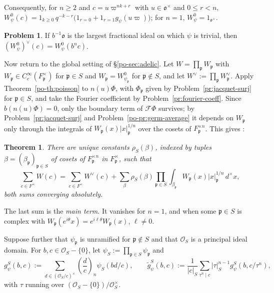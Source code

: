 \documentclass[reqno]{amsart}
\providecommand{\qr}[2]{\left(\frac{#1}{#2}\right)}
\newcommand{\Fc}{\mathcal{F}}
\newcommand{\oo}{\mathfrak{o}}
\newcommand{\pp}{\mathfrak{p}}
\numberwithin{equation}{section}
\theoremstyle{definition}
\newtheorem{problem}{Problem}[section]
\theoremstyle{plain}
\newtheorem{theorem}{Theorem}[section]
\begin{document}
Consequently, for $n \geq 2$ and $c = u \varpi^{n k + r}$ with $u \in \oo^\times$ and $0 \leq r < n$, $W_\psi^0(c) = 1_{k \geq 0} \, q^{-k-r} \bigl( 1_{r = 0} + 1_{r = 1} g_\psi(u \varpi) \bigr)$; for $n = 1$, $W_\psi^0 = 1_{\oo^\times}$.

\begin{problem}\label{pr:basic-dual}
  If $b^{-1} \oo$ is the largest fractional ideal on which $\psi$ is trivial, then $(W_\psi^0)^\vee(c) = W_\psi^0(b^n c)$.
\end{problem}

Now return to the global setting of \S\ref{po-sec:adelic}.  Let $W = \prod_\pp W_\pp$ with $W_\pp \in C_c^\infty(F_\pp^\times)$ for $\pp \in S$ and $W_\pp = W_{\psi_\pp}^0$ for $\pp \notin S$, and let $W^\vee := \prod_\pp W_\pp^\vee$.  Apply Theorem~\ref{po-th:poisson} to $n(u) \Phi$, with $\Phi_\pp$ given by Problem~\ref{pr:jacquet-surj} for $\pp \in S$, and take the Fourier coefficient by Problem~\ref{pr:fourier-coeff}.  Since $b(n(u) \Phi) = 0$, only the boundary term of $\Fc \Phi$ survives; by Problem~\ref{pr:jacquet-surj} and Problem~\ref{po-pr:germ-average} it depends on $W_\pp$ only through the integrals of $W_\pp(x) \lvert x \rvert_\pp^{1/n}$ over the cosets of $F_\pp^{\times n}$.  This gives \cite[Theorem~10.16]{N}:

\begin{theorem}\label{th:main}
  There are unique constants $\rho_S(\beta)$, indexed by tuples $\beta = (\beta_\pp)_{\pp \in S}$ of cosets of $F_\pp^{\times n}$ in $F_\pp^\times$, such that
  \begin{equation*}
    \sum_{c \in F^\times} W(c) = \sum_{c \in F^\times} W^\vee(c)
    + \sum_\beta \rho_S(\beta) \prod_{\pp \in S} \int_{\beta_\pp} W_\pp(x) \lvert x \rvert_\pp^{1/n} \, d^\times x,
  \end{equation*}
  both sums converging absolutely.
\end{theorem}

The last sum is the \emph{main term}.  It vanishes for $n = 1$, and when some $\pp \in S$ is complex with $W_\pp(e^{i \theta} x) = e^{i \ell \theta} W_\pp(x)$, $\ell \neq 0$.

Suppose further that $\psi_\pp$ is unramified for $\pp \notin S$ and that $\mathcal{O}_S$ is a principal ideal domain.  For $b, c \in \mathcal{O}_S - \{0\}$, let $\psi_S := \prod_{\pp \in S} \psi_\pp$ and
\begin{equation*}
  g_\psi^S(b, c) := \sum_{d \in (\mathcal{O}_S / c)^\times} \qr{d}{c}_n \psi_S(b d / c),
  \qquad
  \tilde{g}_\psi^S(b, c) := \frac{1}{\lvert c \rvert_S} \sum_{\tau^n \mid c} \lvert \tau \rvert_S^{n-1} g_\psi^S(b, c / \tau^n),
\end{equation*}
with $\tau$ running over $(\mathcal{O}_S - \{0\}) / \mathcal{O}_S^\times$.
\end{document}
